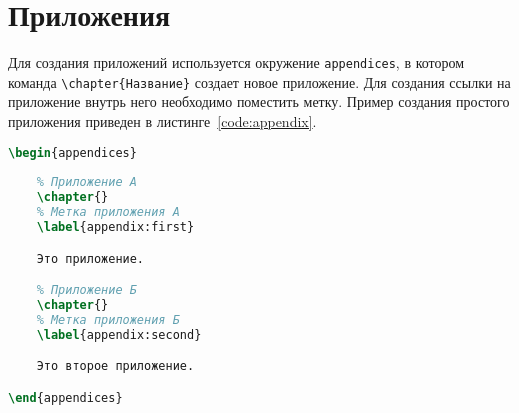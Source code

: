 \section{Приложения}

Для создания приложений используется окружение \lstinline:appendices:, в котором
команда \lstinline:\chapter{Название}: создает новое приложение. 
Для создания ссылки на приложение внутрь него необходимо поместить метку. Пример
создания простого приложения приведен в листинге~\ref{code:appendix}.

\begin{lstlisting}[language=TeX,
    caption=Создание приложения,
    label=code:appendix]
% Окружение для создания приложений
\begin{appendices}
    
    % Приложение A
    \chapter{}
    % Метка приложения А
    \label{appendix:first}

    Это приложение.

    % Приложение Б
    \chapter{}
    % Метка приложения Б
    \label{appendix:second}

    Это второе приложение.

\end{appendices}
\end{lstlisting}